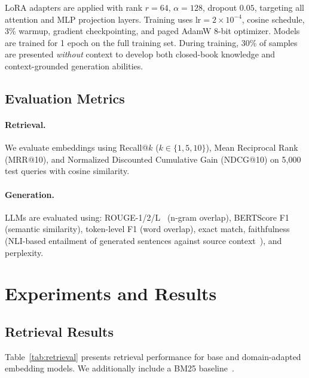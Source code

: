 \documentclass[11pt]{article}
\begin{document}
LoRA adapters are applied with rank $r{=}64$, $\alpha{=}128$, dropout $0.05$,
targeting all attention and MLP projection layers. Training uses
$\text{lr}{=}2 \times 10^{-4}$, cosine schedule, 3\% warmup, gradient
checkpointing, and paged AdamW 8-bit optimizer. Models are trained for 1 epoch
on the full training set. During training, 30\% of samples are presented
\textit{without} context to develop both closed-book knowledge and
context-grounded generation abilities.

\subsection{Evaluation Metrics}

\paragraph{Retrieval.} We evaluate embeddings using Recall@$k$ ($k \in
\{1, 5, 10\}$), Mean Reciprocal Rank (MRR@10), and Normalized Discounted
Cumulative Gain (NDCG@10) on 5,000 test queries with cosine similarity.

\paragraph{Generation.} LLMs are evaluated using:
ROUGE-1/2/L~\citep{lin2004rouge} (n-gram overlap),
BERTScore F1~\citep{zhang2020bertscore} (semantic similarity), token-level F1
(word overlap), exact match, faithfulness (NLI-based entailment of generated
sentences against source context~\citep{honovich2022true}), and perplexity.


\section{Experiments and Results}
\label{sec:results}

\subsection{Retrieval Results}

Table~\ref{tab:retrieval} presents retrieval performance for base and
domain-adapted embedding models. We additionally include a BM25
baseline~\citep{robertson2009bm25}.
\end{document}
